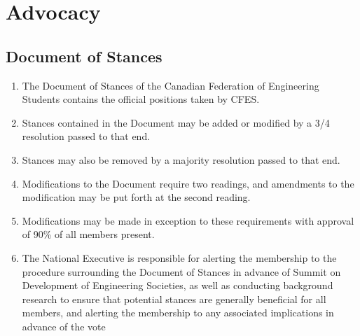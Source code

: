 \section{Advocacy}
\label{advocacy}

\subsection{Document of Stances}
\label{document-of-stances}

\begin{enumerate}
 \item
  The Document of Stances of the Canadian Federation of Engineering Students contains the official positions taken by CFES.
 \item
  Stances contained in the Document may be added or modified by a 3/4 resolution passed to that end.
 \item
  Stances may also be removed by a majority resolution passed to that end.
 \item
  Modifications to the Document require two readings, and amendments to the modification may be put forth at the second reading.
 \item
  Modifications may be made in exception to these requirements with approval of 90\% of all members present.
 \item
  The National Executive is responsible for alerting the membership to the procedure surrounding the Document of Stances in advance of Summit on Development of Engineering Societies, as well as conducting background research to ensure that potential stances are generally beneficial for all members, and alerting the membership to any associated implications in advance of the vote
\end{enumerate}

